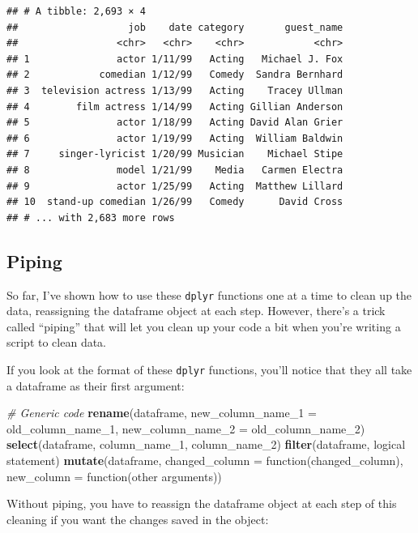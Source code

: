 \documentclass[]{book}
\makeatletter
\newenvironment{Shaded}{\begin{snugshade}}{\end{snugshade}}
\newcommand{\KeywordTok}[1]{\textcolor[rgb]{0.13,0.29,0.53}{\textbf{{#1}}}}
\newcommand{\DataTypeTok}[1]{\textcolor[rgb]{0.13,0.29,0.53}{{#1}}}
\newcommand{\CommentTok}[1]{\textcolor[rgb]{0.56,0.35,0.01}{\textit{{#1}}}}
\newcommand{\NormalTok}[1]{{#1}}
\newenvironment{kframe}{%
\medskip{}
\setlength{\fboxsep}{.8em}
 \def\at@end@of@kframe{}%
 \ifinner\ifhmode%
  \def\at@end@of@kframe{\end{minipage}}%
  \begin{minipage}{\columnwidth}%
 \fi\fi%
 \def\FrameCommand##1{\hskip\@totalleftmargin \hskip-\fboxsep
 \colorbox{shadecolor}{##1}\hskip-\fboxsep
     \hskip-\linewidth \hskip-\@totalleftmargin \hskip\columnwidth}%
 \MakeFramed {\advance\hsize-\width
   \@totalleftmargin\z@ \linewidth\hsize
   \@setminipage}}%
 {\par\unskip\endMakeFramed%
 \at@end@of@kframe}
\renewenvironment{Shaded}{\begin{kframe}}{\end{kframe}}
\makeatother
\begin{document}
\begin{verbatim}
## # A tibble: 2,693 × 4
##                   job    date category       guest_name
##                 <chr>   <chr>    <chr>            <chr>
## 1               actor 1/11/99   Acting   Michael J. Fox
## 2            comedian 1/12/99   Comedy  Sandra Bernhard
## 3  television actress 1/13/99   Acting    Tracey Ullman
## 4        film actress 1/14/99   Acting Gillian Anderson
## 5               actor 1/18/99   Acting David Alan Grier
## 6               actor 1/19/99   Acting  William Baldwin
## 7     singer-lyricist 1/20/99 Musician    Michael Stipe
## 8               model 1/21/99    Media   Carmen Electra
## 9               actor 1/25/99   Acting  Matthew Lillard
## 10  stand-up comedian 1/26/99   Comedy      David Cross
## # ... with 2,683 more rows
\end{verbatim}

\subsection{Piping}\label{piping}

So far, I've shown how to use these \texttt{dplyr} functions one at a
time to clean up the data, reassigning the dataframe object at each
step. However, there's a trick called ``piping'' that will let you clean
up your code a bit when you're writing a script to clean data.

If you look at the format of these \texttt{dplyr} functions, you'll
notice that they all take a dataframe as their first argument:

\begin{Shaded}
\begin{Highlighting}[]
\CommentTok{# Generic code}
\KeywordTok{rename}\NormalTok{(dataframe, }
       \DataTypeTok{new_column_name_1 =} \NormalTok{old_column_name_1,}
       \DataTypeTok{new_column_name_2 =} \NormalTok{old_column_name_2)}
\KeywordTok{select}\NormalTok{(dataframe, column_name_1, column_name_2)}
\KeywordTok{filter}\NormalTok{(dataframe, logical statement)}
\KeywordTok{mutate}\NormalTok{(dataframe,}
       \DataTypeTok{changed_column =} \NormalTok{function(changed_column),}
       \DataTypeTok{new_column =} \NormalTok{function(other arguments))}
\end{Highlighting}
\end{Shaded}

Without piping, you have to reassign the dataframe object at each step
of this cleaning if you want the changes saved in the object:
\end{document}
